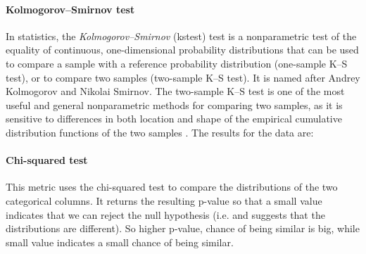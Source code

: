 \documentclass{article}
\begin{document}
\paragraph{Kolmogorov–Smirnov test}
In statistics, the \textit{Kolmogorov–Smirnov} (\acrshort{kstest}) test is a nonparametric test of the equality of continuous, one-dimensional probability distributions that can be used to compare a sample with a reference probability distribution (one-sample K–S test), or to compare two samples (two-sample K–S test). It is named after Andrey Kolmogorov and Nikolai Smirnov. 
The two-sample K–S test is one of the most useful and general nonparametric methods for comparing two samples, as it is sensitive to differences in both location and shape of the empirical cumulative distribution functions of the two samples \cite{kstest_wiki}.  The results for the data are:\\



\paragraph{Chi-squared test}
This metric uses the chi-squared test to compare the distributions of the two categorical columns. It returns the resulting p-value so that a small value indicates that we can reject the null hypothesis (i.e. and suggests that the distributions are different). So higher p-value, chance of being similar is big, while small value indicates a small chance of being similar.\\

\end{document}
